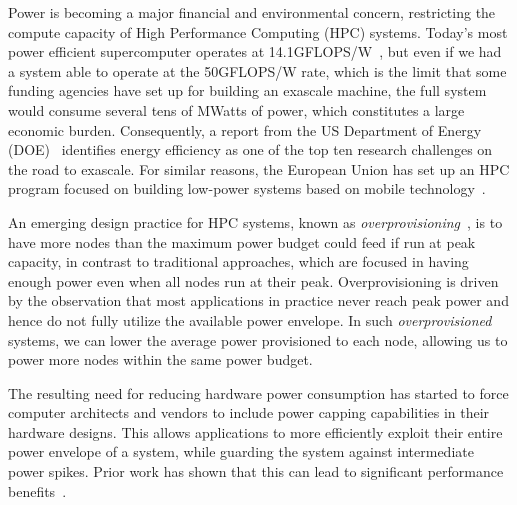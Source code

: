 Power is becoming a major financial and environmental concern, restricting the compute capacity of High Performance Computing (HPC) systems. 
Today's most power efficient supercomputer operates at 14.1GFLOPS/W~\cite{Green500:2017}, but even if we had a system able to operate at the 50GFLOPS/W rate, which is the limit that some funding agencies have set up for building an exascale machine, the full system would consume several tens of MWatts of power, which constitutes a large economic burden. 
Consequently, a report from the US Department of Energy (DOE)~\cite{ASCAC:tech:2014} identifies energy efficiency as one of the top ten research challenges 
on the road to exascale. %
For similar reasons, the European Union has set up an HPC program %
focused on building low-power systems based on mobile technology~\cite{rajovic2013}.
\par
An emerging design practice for HPC systems, known as \textit{overprovisioning}~\cite{patki:2013:eho:2464996.2465009}, 
is to have more nodes than the maximum power budget could feed if run at peak capacity, in contrast to traditional approaches, which are focused in having enough
power even when all nodes run at their peak. 
Overprovisioning is driven by the observation that  most applications in practice never reach peak power and hence do not fully utilize the available power envelope.
In such \textit{overprovisioned} systems, we can lower the average power provisioned to each node, allowing us to power more nodes within the same power budget. 
%
%
\par
The resulting need for reducing hardware power consumption has started to force computer architects and vendors to include power capping capabilities in their hardware designs. This allows applications to more efficiently exploit their entire power envelope of a system, while  guarding the system against intermediate power spikes. Prior work has shown that this can lead to significant performance benefits~\cite{patki:2013:eho:2464996.2465009,conductor2015}.


